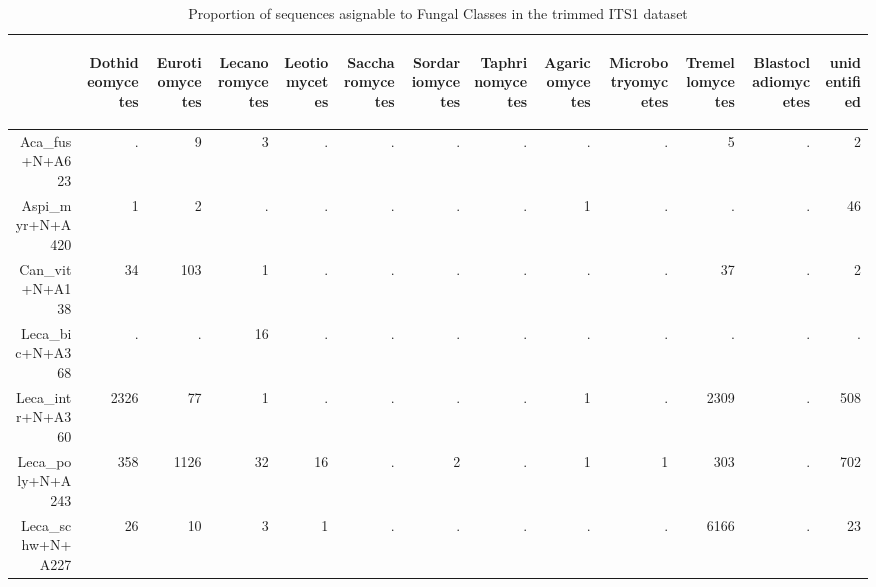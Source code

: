 \documentclass[a4paper, 11]{article}\usepackage[]{graphicx}\usepackage[]{color}
\begin{document}
\begin{table}
\centering
\caption[Classes ITS1]{Proportion of sequences asignable to Fungal Classes in the trimmed ITS1 dataset} 
\begin{tabular}{rrrrrrrrrrrrr}
  \hline
 & \begin{sideways} Dothideomycetes \end{sideways} & \begin{sideways} Eurotiomycetes \end{sideways} & \begin{sideways} Lecanoromycetes \end{sideways} & \begin{sideways} Leotiomycetes \end{sideways} & \begin{sideways} Saccharomycetes \end{sideways} & \begin{sideways} Sordariomycetes \end{sideways} & \begin{sideways} Taphrinomycetes \end{sideways} & \begin{sideways} Agaricomycetes \end{sideways} & \begin{sideways} Microbotryomycetes \end{sideways} & \begin{sideways} Tremellomycetes \end{sideways} & \begin{sideways} Blastocladiomycetes \end{sideways} & \begin{sideways} unidentified \end{sideways} \\ 
  \hline
Aca\_fus+N+A623 & . & 9 & 3 & . & . & . & . & . & . & 5 & . & 2 \\ 
  Aspi\_myr+N+A420 & 1 & 2 & . & . & . & . & . & 1 & . & . & . & 46 \\ 
  Can\_vit+N+A138 & 34 & 103 & 1 & . & . & . & . & . & . & 37 & . & 2 \\ 
  Leca\_bic+N+A368 & . & . & 16 & . & . & . & . & . & . & . & . & . \\ 
  Leca\_intr+N+A360 & 2326 & 77 & 1 & . & . & . & . & 1 & . & 2309 & . & 508 \\ 
  Leca\_poly+N+A243 & 358 & 1126 & 32 & 16 & . & 2 & . & 1 & 1 & 303 & . & 702 \\ 
  Leca\_schw+N+A227 & 26 & 10 & 3 & 1 & . & . & . & . & . & 6166 & . & 23 \\ 

\end{tabular}
\end{table}
\end{document}
